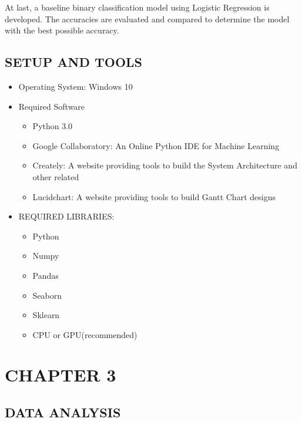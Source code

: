 \documentclass[12pt]{article}
\begin{document}
   

At last, a baseline binary classification model using Logistic Regression is developed. The
accuracies are evaluated and compared to determine the model with the best possible
accuracy.
\pagebreak
   
\subsection{SETUP AND TOOLS}
    \begin{itemize}
            \item Operating System: Windows 10
            \item Required Software
             \begin{itemize}
                 \item Python 3.0
                 \item Google Collaboratory: An Online Python IDE for Machine Learning
                 \item Creately: A website providing tools to build the System Architecture and other related 
                 \item Lucidchart: A website providing tools to build Gantt Chart
                                designs     
             \end{itemize}
     \item REQUIRED LIBRARIES:
            \begin{itemize}
                           \item Python 
                        \item Numpy \item Pandas  \item Seaborn  
                         \item Sklearn\item CPU or GPU(recommended)
                        \end{itemize}
                        
    \end{itemize}
 
  \pagebreak
\section{CHAPTER 3}


\subsection{DATA ANALYSIS}
\end{document}
